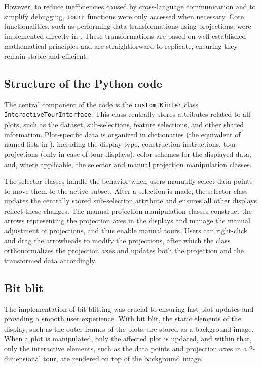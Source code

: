\documentclass[article]{ajs}
\begin{document}
However, to reduce inefficiencies caused by cross-language communication and to simplify debugging, \texttt{tourr} functions were only accessed when necessary. Core functionalities, such as performing data transformations using projections, were implemented directly in . These transformations are based on well-established mathematical principles and are straightforward to replicate, ensuring they remain stable and efficient.

\subsection{Structure of the Python code}

The central component of the  code is the \texttt{customTKinter} class \texttt{InteractiveTourInterface}. This class centrally stores attributes related to all plots, such as the dataset, sub-selections, feature selections, and other shared information. Plot-specific data is organized in dictionaries (the  equivalent of named lists in ), including the display type, construction instructions, tour projections (only in case of tour displays), color schemes for the displayed data, and, where applicable, the selector and manual projection manipulation classes.

The selector classes handle the behavior when users manually select data points to move them to the active subset. After a selection is made, the selector class updates the centrally stored sub-selection attribute and ensures all other displays reflect these changes. The manual projection manipulation classes construct the arrows representing the projection axes in the displays and manage the manual adjustment of projections, and thus enable manual tours. Users can right-click and drag the arrowheads to modify the projections, after which the class orthonormalizes the projection axes and updates both the projection and the transformed data accordingly.

\subsection{Bit blit}

The implementation of bit blitting was crucial to ensuring fast plot updates and providing a smooth user experience. With bit blit, the static elements of the display, such as the outer frames of the plots, are stored as a background image. When a plot is manipulated, only the affected plot is updated, and within that, only the interactive elements, such as the data points and projection axes in a 2-dimensional tour, are rendered on top of the background image.
\end{document}
